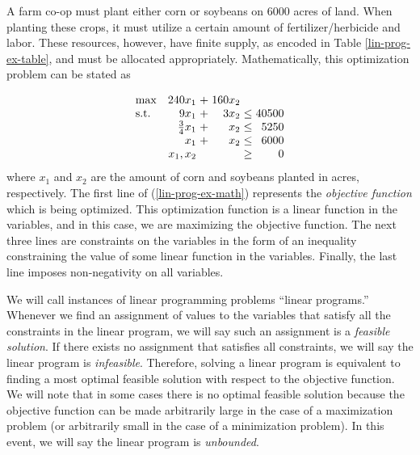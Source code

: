 \documentclass{article}
\begin{document}
A farm co-op must plant either corn or soybeans on 6000 acres of land. When planting these crops, it must utilize a certain amount of fertilizer/herbicide and labor. These resources, however, have finite supply, as encoded in Table \ref{lin-prog-ex-table}, and must be allocated appropriately. Mathematically, this optimization problem can be stated as

\begin{equation}
\setlength\arraycolsep{1.5pt}
  \begin{array}{l@{\quad} r c r c r}
    \max          & 240x_1 & + &         160x_2 &      &    \\
    \mathrm{s.t.} &   9x_1 & + &           3x_2 & \leq & 40500 \\
                  &    \frac{3}{4}x_1 & + &           x_2 & \leq &  5250 \\
                  & x_1 & + & x_2 & \leq & 6000 \\
                  &    x_1, x_2 &  & & \geq &  0 \\
  \end{array}
  \label{lin-prog-ex-math}
\end{equation}
where $x_1$ and $x_2$ are the amount of corn and soybeans planted in acres, respectively.
The first line of (\ref{lin-prog-ex-math}) represents the \textit{objective function} which is being optimized. This optimization function is a linear function in the variables, and in this case, we are maximizing the objective function. The next three lines are constraints on the variables in the form of an inequality constraining the value of some linear function in the variables. Finally, the last line imposes non-negativity on all variables.

We will call instances of linear programming problems ``linear programs.'' Whenever we find an assignment of values to the variables that satisfy all the constraints in the linear program, we will say such an assignment is a \textit{feasible solution}. If there exists no assignment that satisfies all constraints, we will say the linear program is \textit{infeasible}. Therefore, solving a linear program is equivalent to finding a most optimal feasible solution with respect to the objective function. We will note that in some cases there is no optimal feasible solution because the objective function can be made arbitrarily large in the case of a maximization problem (or arbitrarily small in the case of a minimization problem). In this event, we will say the linear program is \textit{unbounded}.
\end{document}
